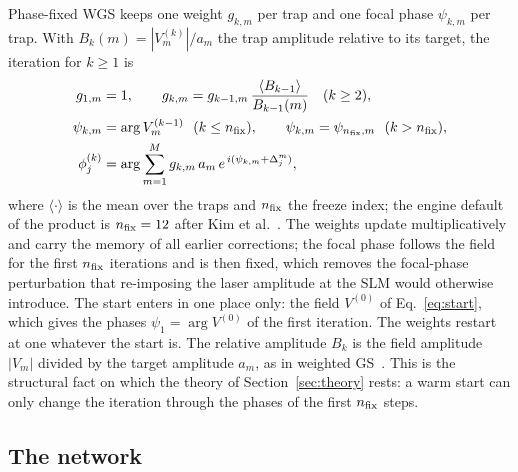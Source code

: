 Phase-fixed WGS keeps one weight $g_{k,m}$ per trap and one focal phase $\psi_{k,m}$ per trap. With $B_{k}(m)=|V^{(k)}_m|/a_m$ the trap amplitude relative to its target, the iteration for $k\ge1$ is
\begin{align}
g_{1,m}&=1,\qquad g_{k,m}=g_{k-1,m}\,\frac{\langle B_{k-1}\rangle}{B_{k-1}(m)}\quad(k\ge2),\label{eq:weights}\\
\psi_{k,m}&=\arg V^{(k-1)}_m\ \ (k\le n_{\mathrm{fix}}),\qquad \psi_{k,m}=\psi_{n_{\mathrm{fix}},m}\ \ (k>n_{\mathrm{fix}}),\label{eq:freeze}\\
\phi^{(k)}_j&=\arg\sum_{m=1}^{M}g_{k,m}\,a_m\,e^{\,i(\psi_{k,m}+\Delta_j^m)},\label{eq:update}
\end{align}
where $\langle\cdot\rangle$ is the mean over the traps and $n_{\mathrm{fix}}$ the freeze index; the engine default of the product is $n_{\mathrm{fix}}=12$ after Kim et al.~\cite{kim2019}. The weights update multiplicatively and carry the memory of all earlier corrections; the focal phase follows the field for the first $n_{\mathrm{fix}}$ iterations and is then fixed, which removes the focal-phase perturbation that
re-imposing the laser amplitude at the SLM would otherwise introduce. The start enters in one place only: the field $V^{(0)}$ of Eq.~\eqref{eq:start}, which gives the phases $\psi_{1}=\arg V^{(0)}$ of the first iteration. The weights restart at one whatever the start is. The relative amplitude $B_k$ is the field amplitude $|V_m|$ divided by the target amplitude $a_m$, as in weighted GS~\cite{dileonardo}. This is the structural fact on which the theory of Section~\ref{sec:theory} rests: a warm start can only change the iteration through the phases of the first $n_{\mathrm{fix}}$
steps.

\subsection{The network}\label{sec:network}

